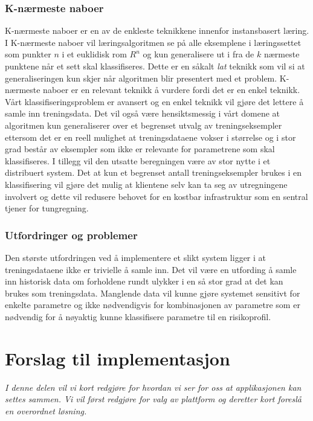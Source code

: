 \documentclass[a4paper,norsk,oneside]{book}
\begin{document}
\subsection{K-nærmeste naboer}
K-nærmeste naboer er en av de enkleste teknikkene innenfor instansbasert læring. I K-nærmeste naboer vil læringsalgoritmen se på alle eksemplene i læringssettet som punkter $n$ i et euklidisk rom $R^n$ og kun generalisere ut i fra de $k$ nærmeste punktene når et sett skal klassifiseres.\cite{mitchell} Dette er en såkalt \textit{lat} teknikk som vil si at generaliseringen kun skjer når algoritmen blir presentert med et problem. K-nærmeste naboer er en relevant teknikk å vurdere fordi det er en enkel teknikk. Vårt klassifiseringsproblem er avansert og en enkel teknikk vil gjøre det lettere å samle inn treningsdata. Det vil også være hensiktsmessig i vårt domene at algoritmen kun generaliserer over et begrenset utvalg av treningseksempler ettersom det er en reell mulighet at treningsdataene vokser i størrelse og i stor grad består av eksempler som ikke er relevante for parametrene som skal klassifiseres. I tillegg vil den utsatte beregningen være av stor nytte i et distribuert system. Det at kun et begrenset antall treningseksempler brukes i en klassifisering vil gjøre det mulig at klientene selv kan ta seg av utregningene involvert og dette vil redusere behovet for en kostbar infrastruktur som en sentral tjener for tungregning.

\subsection{Utfordringer og problemer}
Den største utfordringen ved å implementere et slikt system ligger i at treningsdataene ikke er trivielle å samle inn. Det vil være en utfording å samle inn historisk data om forholdene rundt ulykker i en så stor grad at det kan brukes som treningsdata. Manglende data vil kunne gjøre systemet sensitivt for enkelte parametre og ikke nødvendigvis for kombinasjonen av parametre som er nødvendig for å nøyaktig kunne klassifisere parametre til en risikoprofil.  

\chapter{Forslag til implementasjon}
\label{cha:implementasjon}

{\it I denne delen vil vi kort redgjøre for hvordan vi ser for oss at applikasjonen kan settes sammen. Vi vil først redgjøre for valg av plattform og deretter kort foreslå en overordnet løsning.}
\end{document}
